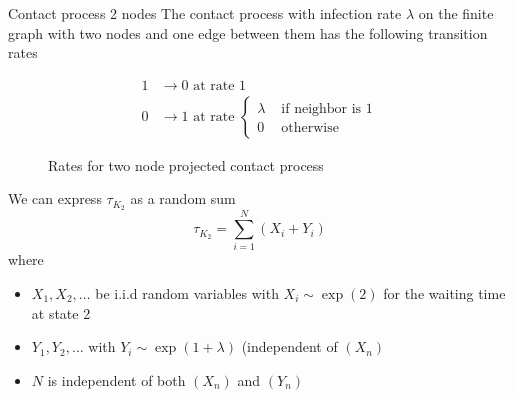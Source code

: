 \documentclass{beamer}
\theoremstyle{definition}
\begin{document}
\begin{frame}{Contact process 2 nodes}
The contact process with infection rate $\lambda$ on the finite graph with two nodes and one edge between them has the following transition rates

\begin{align*}
    1 &\to 0 \text{ at rate } 1\\
    0 &\to 1 \text{ at rate } \begin{cases}
        \lambda & \text{ if neighbor is 1}\\
        0 & \text{ otherwise}
    \end{cases}
\end{align*}
\end{frame}

\begin{frame}
    \begin{figure}[H]
    \centering
    \caption{Rates for two node projected contact process}
    \label{fig:rates_mc_two_contact}
\end{figure}

We can express $\tau_{K_2}$ as a random sum
$$
\tau_{K_2} = \sum_{i = 1}^N (X_i + Y_i)
$$
where 
\begin{itemize}
    \item $X_1, X_2, \ldots$ be i.i.d random variables with
$X_i \sim \exp(2)$ for the waiting time at state 2
    \item $Y_1, Y_2, \ldots$ with  $Y_i \sim \exp(1 + \lambda)$ (independent of $(X_n)$
    \item $N$ is independent of both $(X_n)$ and $(Y_n)$
\end{itemize}
\end{frame}
\end{document}
